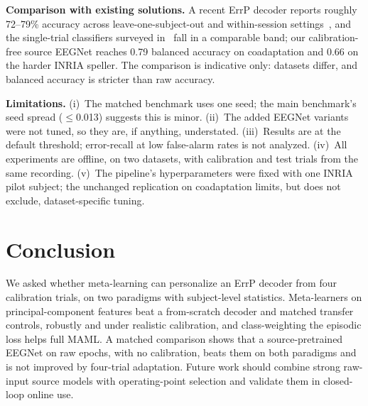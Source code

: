 \documentclass[conference,a4paper]{IEEEtran}
\begin{document}
\textbf{Comparison with existing solutions.} A recent ErrP decoder reports roughly 72--79\% accuracy across leave-one-subject-out and within-session settings~\cite{ren2024deep}, and the single-trial classifiers surveyed in~\cite{yasemin2023single} fall in a comparable band; our calibration-free source EEGNet reaches 0.79 balanced accuracy on coadaptation and 0.66 on the harder INRIA speller. The comparison is indicative only: datasets differ, and balanced accuracy is stricter than raw accuracy.

\textbf{Limitations.} (i)~The matched benchmark uses one seed; the main benchmark's
seed spread ($\le$0.013) suggests this is minor. (ii)~The added EEGNet variants were
not tuned, so they are, if anything, understated. (iii)~Results are at the default
threshold; error-recall at low false-alarm rates is not analyzed. (iv)~All experiments
are offline, on two datasets, with calibration and test trials from the same
recording. (v)~The pipeline's hyperparameters were fixed with one INRIA pilot subject;
the unchanged replication on coadaptation limits, but does not exclude, dataset-specific
tuning.

\section{Conclusion}
We asked whether meta-learning can personalize an ErrP decoder from four calibration
trials, on two paradigms with subject-level statistics. Meta-learners on
principal-component features beat a from-scratch decoder and matched transfer controls,
robustly and under realistic calibration, and class-weighting the episodic loss helps
full MAML. A matched comparison shows that a source-pretrained EEGNet on raw
epochs, with no calibration, beats them on both paradigms and is not improved by
four-trial adaptation. Future work should combine strong raw-input source models with
operating-point selection and validate them in closed-loop online use.



\end{document}
